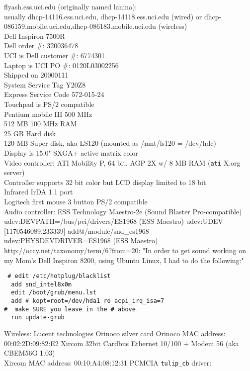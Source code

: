 \documentclass[12pt,twoside]{article}
\begin{document}
flyash.ess.uci.edu (originally named lanina):\\
usually dhcp-14116.ess.uci.edu, dhcp-14118.ess.uci.edu (wired) or dhcp-086159.mobile.uci.edu,dhcp-086183.mobile.uci.edu (wireless) \\
Dell Inspiron 7500R\\
Dell order \#: 320036478\\
UCI is Dell customer \#: 6774301\\
Laptop is UCI PO \#: 0120L03002256\\
Shipped on 20000111\\
System Service Tag Y20Z8\\
Express Service Code 572-015-24\\
Touchpad is PS/2 compatible\\
Pentium mobile III 500 MHz\\
512 MB 100 MHz RAM\\
25 GB Hard disk\\
120 MB Super disk, aka LS120 (mounted as /mnt/ls120 = /dev/hdc)\\
Display is 15.0" SXGA+ active matrix color \\
Video controller: ATI Mobility P, 64 bit, AGP 2X w/ 8 MB RAM (\verb'ati' X.org server)\\
Controller supports 32 bit color but LCD display limited to 18 bit\\
Infrared IrDA 1.1 port\\
Logitech first mouse 3 button PS/2 compatible\\
Audio controller: ESS Technology Maestro-2e (Sound Blaster Pro-compatible)\\
udev:DEVPATH=/bus/pci/drivers/ES1968 (ESS Maestro)
udev:UDEV  [1170546089.233339] add@/module/snd\_es1968
udev:PHYSDEVDRIVER=ES1968 (ESS Maestro)
http://occy.net/taxonomy/term/6?from=20:
"In order to get sound working on my Mom's Dell Inspiron 8200, using
Ubuntu Linux, I had to do the following:"
\begin{verbatim}
 # edit /etc/hotplug/blacklist
  add snd_intel8x0m
  edit /boot/grub/menu.lst
  add # kopt=root=/dev/hda1 ro acpi_irq_isa=7
#  make SURE you leave in the # above
  run update-grub
\end{verbatim}
Wireless: Lucent technologies Orinoco silver card
Orinoco MAC address: 00:02:2D:09:82:E2
Xircom 32bit Cardbus Ethernet 10/100 + Modem 56 (aka CBEM56G 1.03) \\
Xircom MAC address: 00:10:A4:08:12:31
PCMCIA \verb'tulip_cb' driver:\\
\end{document}
